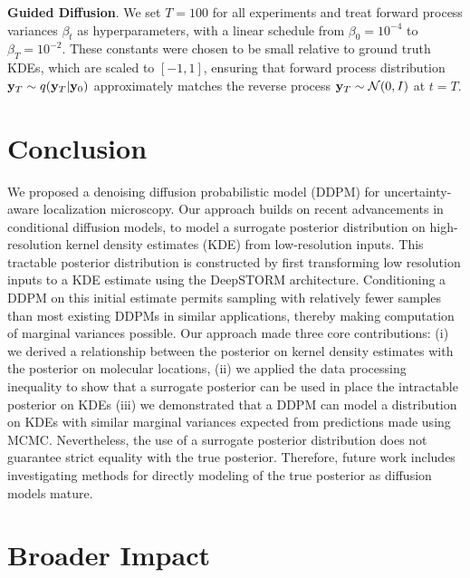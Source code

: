 \documentclass{article}
\begin{document}
\textbf{Guided Diffusion}. We set $T = 100$ for all experiments and treat forward process variances $\beta_{t}$ as hyperparameters, with a linear schedule from $\beta_{0}=10^{-4}$ to $\beta_{T}=10^{-2}$.
These constants were chosen to be small relative to ground truth KDEs, which are scaled to $[-1,1]$, ensuring that forward process distribution $\bold{y}_{T}\sim q(\bold{y}_{T}|\bold{y}_{0})$ approximately matches the reverse process $\bold{y}_T\sim \mathcal{N}(0, I)$ at $t=T$.


\section{Conclusion}

We proposed a denoising diffusion probabilistic model (DDPM) for uncertainty-aware localization microscopy. Our approach builds on recent advancements in conditional diffusion models, to model a surrogate posterior distribution on high-resolution kernel density estimates (KDE) from low-resolution inputs. This tractable posterior distribution is constructed by first transforming low resolution inputs to a KDE estimate using the DeepSTORM architecture. Conditioning a DDPM on this initial estimate permits sampling with relatively fewer samples than most existing DDPMs in similar applications, thereby making computation of marginal variances possible. Our approach made three core contributions: (i) we derived a relationship between the posterior on kernel density estimates with the posterior on molecular locations, (ii) we applied the data processing inequality to show that a surrogate posterior can be used in place the intractable posterior on KDEs (iii) we demonstrated that a DDPM can model a distribution on KDEs with similar marginal variances expected from predictions made using MCMC. Nevertheless, the use of a surrogate posterior distribution does not guarantee strict equality with the true posterior. Therefore, future work includes investigating methods for directly modeling of the true posterior as diffusion models mature. 

\section{Broader Impact}
\end{document}
